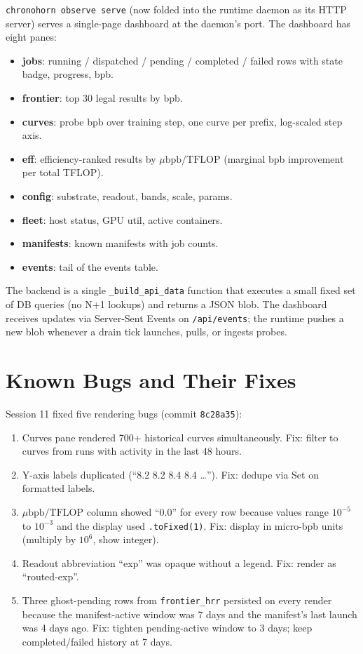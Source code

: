\documentclass[11pt,openany]{book}
\theoremstyle{definition}
\theoremstyle{plain}
\newcommand{\bpb}{\text{bpb}}
\begin{document}
\texttt{chronohorn observe serve} (now folded into the runtime daemon
as its HTTP server) serves a single-page dashboard at the daemon's port.
The dashboard has eight panes:
\begin{itemize}
  \item \textbf{jobs}: running / dispatched / pending / completed /
    failed rows with state badge, progress, bpb.
  \item \textbf{frontier}: top 30 legal results by bpb.
  \item \textbf{curves}: probe bpb over training step, one curve per
    prefix, log-scaled step axis.
  \item \textbf{eff}: efficiency-ranked results by $\mu\bpb/\text{TFLOP}$
    (marginal bpb improvement per total TFLOP).
  \item \textbf{config}: substrate, readout, bands, scale, params.
  \item \textbf{fleet}: host status, GPU util, active containers.
  \item \textbf{manifests}: known manifests with job counts.
  \item \textbf{events}: tail of the events table.
\end{itemize}

The backend is a single \texttt{\_build\_api\_data} function that
executes a small fixed set of DB queries (no N+1 lookups) and returns
a JSON blob. The dashboard receives updates via Server-Sent Events on
\texttt{/api/events}; the runtime pushes a new blob whenever a drain
tick launches, pulls, or ingests probes.

\section{Known Bugs and Their Fixes}

Session 11 fixed five rendering bugs (commit \texttt{8c28a35}):
\begin{enumerate}
  \item Curves pane rendered 700+ historical curves simultaneously.
    Fix: filter to curves from runs with activity in the last 48 hours.
  \item Y-axis labels duplicated (``8.2 8.2 8.4 8.4 \ldots'').
    Fix: dedupe via Set on formatted labels.
  \item $\mu\bpb/\text{TFLOP}$ column showed ``0.0'' for every row
    because values range $10^{-5}$ to $10^{-3}$ and the display
    used \texttt{.toFixed(1)}. Fix: display in micro-bpb units
    (multiply by $10^6$, show integer).
  \item Readout abbreviation ``exp'' was opaque without a legend.
    Fix: render as ``routed-exp''.
  \item Three ghost-pending rows from \texttt{frontier\_hrr} persisted
    on every render because the manifest-active window was 7 days and
    the manifest's last launch was 4 days ago. Fix: tighten
    pending-active window to 3 days; keep completed/failed history at
    7 days.
\end{enumerate}
\end{document}
